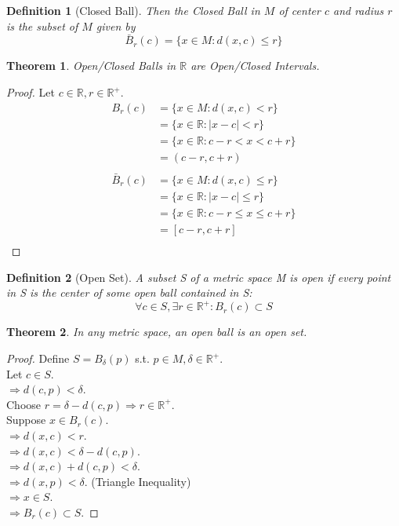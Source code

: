 \documentclass{article}
\newtheorem{definition}{Definition}[section]
\newtheorem{theorem}{Theorem}[section]
\begin{document}
			\begin{definition}[Closed Ball]
			\label{closed ball}
				Then the Closed Ball in $M$ of center $c$ and radius $r$ is the subset of $M$ given by
				$$\bar{B}_r(c) = \{x \in M: d(x, c) \leq r \}$$
			\end{definition}

			\begin{theorem}
				Open/Closed Balls in $\mathbb{R}$ are Open/Closed Intervals.
			\end{theorem}
			\begin{proof}
				Let $c \in \mathbb{R}, r \in \mathbb{R}^+$.
				\begin{align*}
					B_r(c) &= \{ x \in M: d(x, c) < r \} \\
						   &= \{ x \in \mathbb{R}: |x - c| < r \} \\
						   &= \{ x \in \mathbb{R}: c - r < x < c + r \} \\
						   &= (c - r, c + r) \\
				\end{align*}
				\begin{align*}
					\bar{B}_r(c) &= \{ x \in M: d(x, c) \leq r \} \\
						   &= \{ x \in \mathbb{R}: |x - c| \leq r \} \\
						   &= \{ x \in \mathbb{R}: c - r \leq x \leq c + r \} \\
						   &= [c - r, c + r] \\
				\end{align*}
			\end{proof}

			\begin{definition}[Open Set]
				\label{open set}
				A subset S of a metric space M is open if every point in S is the center of some open ball contained in S:
				$$\forall c \in S, \exists r \in \mathbb{R}^+: B_{r}(c) \subset S $$
			\end{definition}

			\begin{theorem}
				In any metric space, an open ball is an open set.
			\end{theorem}
			\begin{proof} 
				Define $S = B_{\delta}(p)$ s.t.  $p \in M, \delta \in \mathbb{R}^+$.\\
				Let $c \in S$.\\
				$\Rightarrow d(c, p) < \delta$.\\
				Choose $r = \delta - d(c, p) \Rightarrow r \in \mathbb{R}^+$.\\
				Suppose $x \in B_{r}(c)$.\\
				$\Rightarrow d(x, c) < r$.\\
				$\Rightarrow d(x, c) < \delta - d(c, p)$.\\
				$\Rightarrow d(x, c) + d(c, p) < \delta$.\\
				$\Rightarrow d(x, p) < \delta$. (Triangle Inequality) \\
				$\Rightarrow x \in S$.\\
				$\Rightarrow B_{r}(c) \subset S$.
			\end{proof}
\end{document}
